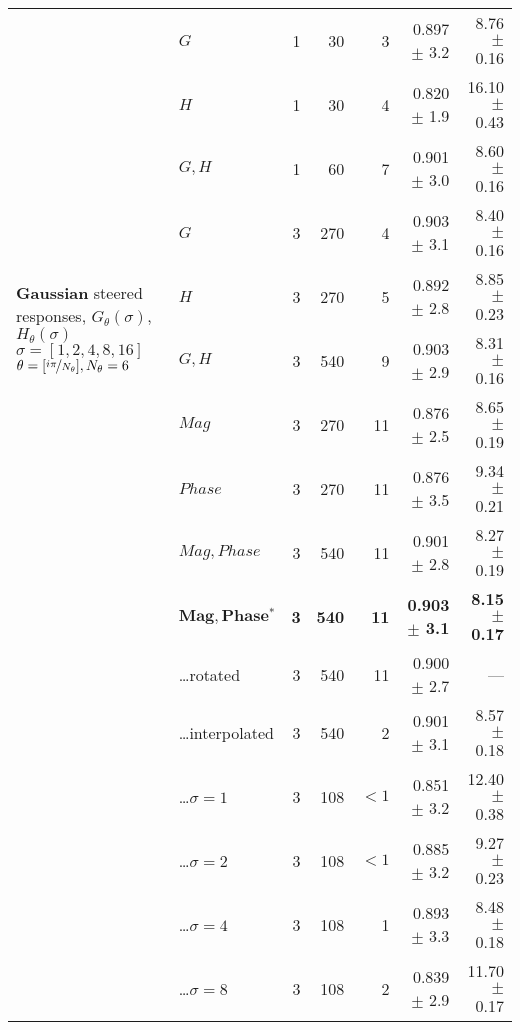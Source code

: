 \begin{tabularx}{\linewidth}{p{3.1cm} p{3cm} r r r r r}
\midrule
\multirow{10}{3.1cm}{\centering
    \textbf{Gaussian}
    \newline steered responses,
    \newline
    \newline $G_{\theta}(\sigma)$, $H_{\theta}(\sigma)$
    \newline $\sigma = [1, 2, 4, 8, 16]$
    \newline $\theta = [ \nicefrac{i\pi}{N_\theta} ], N_\theta = 6$ }
        & $G$                       & 1 &  30   &  3    & 0.897 $\pm$ 3.2   & 8.76 $\pm$ 0.16 \\
        & $H$                       & 1 &  30   &  4    & 0.820 $\pm$ 1.9   &16.10 $\pm$ 0.43 \\
        & $G,H$                     & 1 &  60   &  7    & 0.901 $\pm$ 3.0   & 8.60 $\pm$ 0.16 \\
        & $G$                       & 3 & 270   &  4    & 0.903 $\pm$ 3.1   & 8.40 $\pm$ 0.16 \\
        & $H$                       & 3 & 270   &  5    & 0.892 $\pm$ 2.8   & 8.85 $\pm$ 0.23 \\
        & $G,H$                     & 3 & 540   &  9    & 0.903 $\pm$ 2.9   & 8.31 $\pm$ 0.16 \\
        & $Mag$                     & 3 & 270   & 11    & 0.876 $\pm$ 2.5   & 8.65 $\pm$ 0.19 \\
        & $Phase$                   & 3 & 270   & 11    & 0.876 $\pm$ 3.5   & 9.34 $\pm$ 0.21 \\
        & $Mag, Phase$              & 3 & 540   & 11    & 0.901 $\pm$ 2.8   & 8.27 $\pm$ 0.19 \\
        & $\mathbf{Mag, Phase{^*}}$ & \textbf{3} & \textbf{540} & \textbf{11} & \textbf{0.903 $\pm$ 3.1} & \textbf{8.15 $\pm$ 0.17} \\
        & \hspace{2mm} \ldots rotated
                                    & 3 & 540   & 11    & 0.900 $\pm$ 2.7   & --- \\
        & \hspace{2mm} \ldots interpolated
                                    & 3 & 540   &  2    & 0.901 $\pm$ 3.1   & 8.57 $\pm$ 0.18 \\
        & \hspace{2mm} \ldots ${\sigma = 1}$
                                    & 3 & 108   &${<}1$ & 0.851 $\pm$ 3.2   &12.40 $\pm$ 0.38 \\
        & \hspace{2mm} \ldots ${\sigma = 2}$
                                    & 3 & 108   &${<}1$ & 0.885 $\pm$ 3.2   & 9.27 $\pm$ 0.23 \\
        & \hspace{2mm} \ldots ${\sigma = 4}$
                                    & 3 & 108   &  1    & 0.893 $\pm$ 3.3   & 8.48 $\pm$ 0.18 \\
        & \hspace{2mm} \ldots ${\sigma = 8}$
                                    & 3 & 108   &  2    & 0.839 $\pm$ 2.9   &11.70 $\pm$ 0.17 \\


\end{tabularx}
